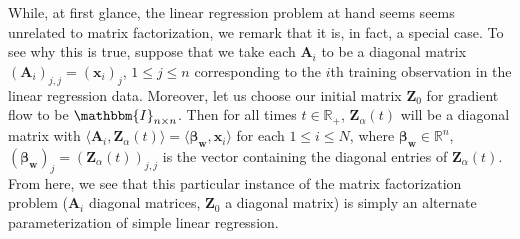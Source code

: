 \documentclass{article}
\begin{document}
While, at first glance, the linear regression problem at hand seems seems unrelated to matrix factorization, we remark that it is, in fact, a special case. To see why this is true, suppose that we take each $\boldsymbol{A}_i$ to be a diagonal matrix $(\boldsymbol{A}_i)_{j,j} = (\boldsymbol{x}_i)_j$, $1 \leq j \leq n$ corresponding to the $i$th training observation in the linear regression data. Moreover, let us choose our initial matrix $\boldsymbol{Z}_0$ for gradient flow to be $\mathbbm{I}_{n \times n}$. Then for all times $t \in \mathbb{R}_+$, $\boldsymbol{Z}_{\alpha}(t)$ will be a diagonal matrix with $\langle \boldsymbol{A}_i, \boldsymbol{Z}_{\alpha}(t) \rangle = \langle \boldsymbol{\beta}_{\boldsymbol{w}},\boldsymbol{x}_i \rangle$ for each $1 \leq i \leq N$, where $\boldsymbol{\beta}_{\boldsymbol{w}} \in \mathbb{R}^n$, $(\boldsymbol{\beta}_{\boldsymbol{w}})_j = (\boldsymbol{Z}_{\alpha}(t))_{j,j}$ is the vector containing the diagonal entries of $\boldsymbol{Z}_{\alpha}(t)$. From here, we see that this particular instance of the matrix factorization problem ($\boldsymbol{A}_i$ diagonal matrices, $\boldsymbol{Z}_0$ a diagonal matrix) is simply an alternate parameterization of simple linear regression.
\end{document}
